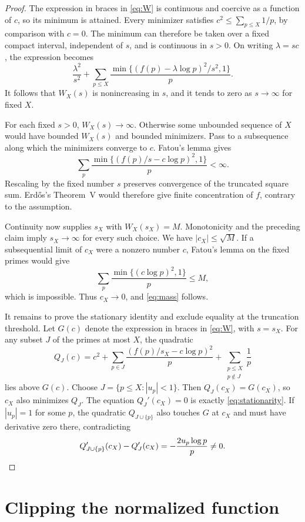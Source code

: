 \documentclass[11pt]{article}
\numberwithin{equation}{section}
\begin{document}
\begin{proof}
The expression in braces in \eqref{eq:W} is continuous and coercive
as a function of $c$, so its minimum is attained. Every minimizer
satisfies $c^2\le\sum_{p\le X}1/p$, by comparison with $c=0$.
The minimum can therefore be taken over a fixed compact interval,
independent of $s$, and is continuous in $s>0$.
On writing $\lambda=sc$, the expression
becomes
\[
 \frac{\lambda^2}{s^2}
 +\sum_{p\le X}\frac{\min\{(f(p)-\lambda\log p)^2/s^2,1\}}p.
\]
It follows that $W_X(s)$ is nonincreasing in $s$, and it tends to
zero as $s\to\infty$ for fixed $X$.

For each fixed $s>0$, $W_X(s)\to\infty$. Otherwise
some unbounded sequence of $X$ would have bounded $W_X(s)$ and
bounded minimizers. Pass to a subsequence along which the minimizers
converge to $c$. Fatou's lemma gives
\[
 \sum_p\frac{\min\{(f(p)/s-c\log p)^2,1\}}p<\infty.
\]
Rescaling by the fixed number $s$ preserves convergence of the
truncated square sum. Erd\H{o}s's Theorem~V would therefore give
finite concentration of $f$, contrary to the assumption.

Continuity now supplies $s_X$ with $W_X(s_X)=M$. Monotonicity and
the preceding claim imply $s_X\to\infty$ for every such choice. We have
$|c_X|\le\sqrt M$. If a subsequential limit of $c_X$ were a
nonzero number $c$, Fatou's lemma on the fixed primes would give
\[
 \sum_p\frac{\min\{(c\log p)^2,1\}}p\le M,
\]
which is impossible. Thus $c_X\to0$, and \eqref{eq:mass} follows.

It remains to prove the stationary identity and exclude equality at
the truncation threshold. Let $G(c)$ denote the expression in braces
in \eqref{eq:W}, with $s=s_X$. For any subset $J$ of the primes at most
$X$, the quadratic
\[
 Q_J(c)=c^2+\sum_{p\in J}\frac{(f(p)/s_X-c\log p)^2}{p}
             +\sum_{\substack{p\le X\\p\notin J}}\frac1p
\]
lies above $G(c)$. Choose $J=\{p\le X:|u_p|<1\}$. Then
$Q_J(c_X)=G(c_X)$, so $c_X$ also minimizes $Q_J$. The equation
$Q_J'(c_X)=0$ is exactly \eqref{eq:stationarity}.
If $|u_p|=1$ for some $p$, the quadratic $Q_{J\cup\{p\}}$ also
touches $G$ at $c_X$ and must have derivative zero there, contradicting
\[
 Q_{J\cup\{p\}}'(c_X)-Q_J'(c_X)
 =-\frac{2u_p\log p}{p}\ne0.\qedhere
\]
\end{proof}

\section{Clipping the normalized function}
\end{document}
